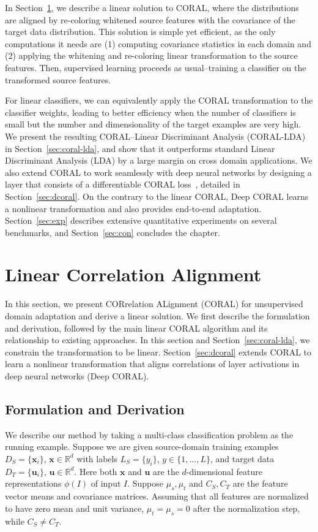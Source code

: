 \documentclass[graybox]{svmult}
\newcommand{\xSrc}{\vec{x}}
\newcommand{\ySrc}{y}
\newcommand{\xTar}{\vec{u}}
\renewcommand\vec[1]{\mathbf{#1}}
\begin{document}
In Section~\ref{sec:coral}, we describe a linear solution to CORAL, where the distributions are aligned by re-coloring whitened source features with the covariance of the target data distribution. This solution is simple yet efficient, as the only computations it needs are (1) computing covariance statistics in each domain and (2) applying the whitening and re-coloring linear transformation to the source features. Then, supervised learning proceeds as usual--training a classifier on the transformed source features. 

For linear classifiers, we can equivalently apply the CORAL transformation to the classifier weights, leading to better efficiency when the number of classifiers is small but the number and dimensionality of the target examples are very high. We present the resulting CORAL--Linear Discriminant Analysis (CORAL-LDA)~\cite{coral-lda} in Section~\ref{sec:coral-lda}, and show that it outperforms standard Linear Discriminant Analysis (LDA) by a large margin on cross domain applications. We also extend CORAL to work seamlessly with deep neural networks by designing a layer that consists of a differentiable CORAL loss~\cite{dcoral}, detailed in Section~\ref{sec:dcoral}. On the contrary to the linear CORAL, Deep CORAL learns a nonlinear transformation and also provides end-to-end adaptation. Section~\ref{sec:exp} describes extensive quantitative experiments on several benchmarks, and Section~\ref{sec:con} concludes the chapter. \section{Linear Correlation Alignment}
\label{sec:coral}

In this section, we present CORrelation ALignment (CORAL) for unsupervised domain adaptation and derive a linear solution. We first describe the formulation and derivation, followed by the main linear CORAL algorithm and its relationship to existing approaches. In this section and Section~\ref{sec:coral-lda}, we constrain the transformation to be linear. Section~\ref{sec:dcoral} extends CORAL to learn a nonlinear transformation that aligns correlations of layer activations in deep neural networks (Deep CORAL).

\subsection{Formulation and Derivation}
We describe our method by taking a multi-class classification problem as the running example. Suppose we are given source-domain training examples $D_S=\{\xSrc_i\}$, $\xSrc\in\mathbb{R}^d$ with labels $L_S=\{\ySrc_i\}$, $\ySrc \in\{1,...,L\}$, and target data $D_T=\{\xTar_i\}$, $\xTar \in \mathbb{R}^d$. Here both $\xSrc$ and $\xTar$ are the $d$-dimensional feature representations $\phi(I)$ of input $I$. Suppose $\mu_s,\mu_t$ and $C_{S}, C_{T}$ are the feature vector means and covariance matrices. Assuming that all features are normalized to have zero mean and unit variance, $\mu_t=\mu_s=0$ after the normalization step, while $C_{S} \neq C_{T}$.
\end{document}
